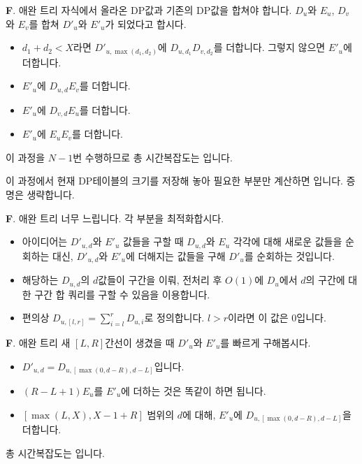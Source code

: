 \begin{frame}{\textbf{F}. 애완 트리}
    자식에서 올라온 DP값과 기존의 DP값을 합쳐야 합니다. $D_u$와 $E_u$, $D_v$와 $E_v$를 합쳐 $D'_u$와 $E'_u$가 되었다고 합시다.
    \begin{itemize}
        \item $d_1+d_2<X$라면 $D'_{u,\max\left(d_1,d_2\right)}$에 $D_{u,d_1} D_{v,d_2}$를 더합니다. 그렇지 않으면 $E'_u$에 더합니다.
        \item $E'_u$에 $D_{u,d}E_v$를 더합니다.
        \item $E'_u$에 $D_{v,d}E_u$를 더합니다.
        \item $E'_u$에 $E_u E_v$를 더합니다.
    \end{itemize}
    이 과정을 $N-1$번 수행하므로 총 시간복잡도는 입니다.
    
    이 과정에서 현재 DP테이블의 크기를 저장해 놓아 필요한 부분만 계산하면 입니다. 증명은 생략합니다.
\end{frame}

\begin{frame}{\textbf{F}. 애완 트리}
    너무 느립니다. 각 부분을 최적화합시다.
    \begin{itemize}
        \item 아이디어는 $D'_{u,d}$와 $E'_u$ 값들을 구할 때 $D_{u,d}$와 $E_u$ 각각에 대해 새로운 값들을 순회하는 대신, $D'_{u,d}$와 $E'_u$에 더해지는 값들을 구해 $D'_u$를 순회하는 것입니다.
        \item 해당하는 $D_{u,d}$의 $d$값들이 구간을 이뤄, 전처리 후 $O(1)$에 $D_u$에서 $d$의 구간에 대한 구간 합 쿼리를 구할 수 있음을 이용합니다.
        \item 편의상 $D_{u,[l,r]}=\sum_{i=l}^{r} D_{u,i}$로 정의합니다. $l>r$이라면 이 값은 $0$입니다.
    \end{itemize}
\end{frame}

\begin{frame}{\textbf{F}. 애완 트리}
    새 $[L,R]$간선이 생겼을 때 $D'_u$와 $E'_u$를 빠르게 구해봅시다.
    \begin{itemize}
        \item $D'_{u,d}=D_{u,[\max\left(0,d-R\right),d-L]}$입니다.
        \item $(R-L+1)E_u$를 $E'_u$에 더하는 것은 똑같이 하면 됩니다.
        \item $[\max\left(L,X\right),X-1+R]$ 범위의 $d$에 대해, $E'_u$에 $D_{u,[\max\left(0,d-R\right),d-L]}$을 더합니다.
    \end{itemize}
    총 시간복잡도는 입니다.
\end{frame}

